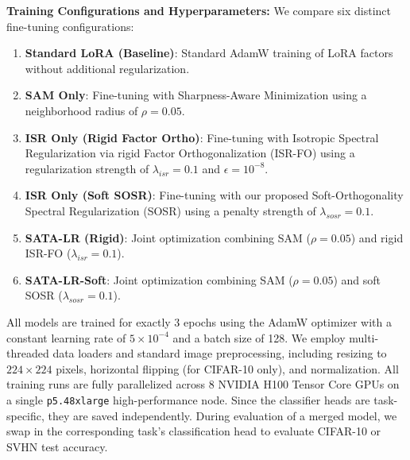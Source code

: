\documentclass{article}
\begin{document}
\textbf{Training Configurations and Hyperparameters:}
We compare six distinct fine-tuning configurations:
\begin{enumerate}\setlength{\itemsep}{0pt}\setlength{\parsep}{0pt}
    \item \textbf{Standard LoRA (Baseline)}: Standard AdamW training of LoRA factors without additional regularization.
    \item \textbf{SAM Only}: Fine-tuning with Sharpness-Aware Minimization using a neighborhood radius of $\rho=0.05$.
    \item \textbf{ISR Only (Rigid Factor Ortho)}: Fine-tuning with Isotropic Spectral Regularization via rigid Factor Orthogonalization (ISR-FO) using a regularization strength of $\lambda_{isr}=0.1$ and $\epsilon=10^{-8}$.
    \item \textbf{ISR Only (Soft SOSR)}: Fine-tuning with our proposed Soft-Orthogonality Spectral Regularization (SOSR) using a penalty strength of $\lambda_{sosr}=0.1$.
    \item \textbf{SATA-LR (Rigid)}: Joint optimization combining SAM ($\rho=0.05$) and rigid ISR-FO ($\lambda_{isr}=0.1$).
    \item \textbf{SATA-LR-Soft}: Joint optimization combining SAM ($\rho=0.05$) and soft SOSR ($\lambda_{sosr}=0.1$).
\end{enumerate}

All models are trained for exactly 3 epochs using the AdamW optimizer \cite{loshchilov2017decoupled} with a constant learning rate of $5\times 10^{-4}$ and a batch size of 128. We employ multi-threaded data loaders and standard image preprocessing, including resizing to $224\times224$ pixels, horizontal flipping (for CIFAR-10 only), and normalization. All training runs are fully parallelized across 8 NVIDIA H100 Tensor Core GPUs on a single \texttt{p5.48xlarge} high-performance node. Since the classifier heads are task-specific, they are saved independently. During evaluation of a merged model, we swap in the corresponding task's classification head to evaluate CIFAR-10 or SVHN test accuracy.
\end{document}
